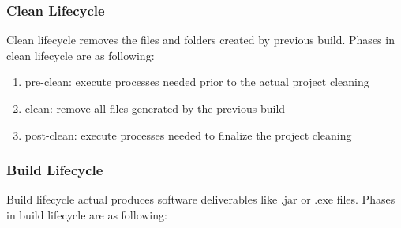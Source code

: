 \documentclass[a4paper,oneside,1,english1pt]{report}
\begin{document}
		\subsubsection{Clean Lifecycle}
		\par Clean lifecycle removes the files and folders created by previous build. Phases in clean lifecycle are as following:
				\begin{enumerate}
					\item pre-clean: 	execute processes needed prior to the actual project cleaning
					\item clean: 	remove all files generated by the previous build
					\item post-clean: 	execute processes needed to finalize the project cleaning
				\end{enumerate}
			\subsubsection{Build Lifecycle}
			\par Build lifecycle actual produces software deliverables like .jar or .exe files. Phases in build lifecycle are as following:
\end{document}
